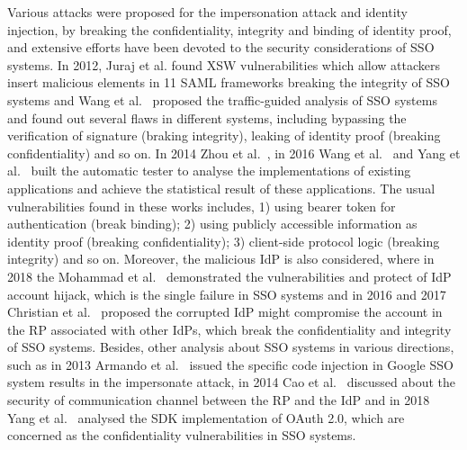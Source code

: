 Various attacks were proposed for the impersonation attack and identity injection, by breaking the confidentiality, integrity and binding of identity proof, and extensive efforts have been devoted to the security considerations of SSO systems. In 2012, Juraj et al.\cite{SomorovskyMSKJ12} found XSW vulnerabilities which allow attackers insert malicious elements in 11 SAML frameworks breaking the integrity of SSO systems and Wang et al.~\cite{WangCW12} proposed the traffic-guided analysis of SSO systems and found out several flaws in different systems, including bypassing the verification of signature (braking integrity), leaking of identity proof (breaking confidentiality) and so on. In 2014 Zhou et al.~\cite{ZhouE14}, in 2016 Wang et al.~\cite{WangZLG16} and Yang et al.~\cite{YangLLZH16} built the automatic tester to analyse the implementations of existing applications and achieve the statistical result of these applications. The usual vulnerabilities found in these works includes, 1) using bearer token for authentication (break binding); 2) using publicly accessible information as identity proof (breaking confidentiality); 3) client-side protocol logic (breaking integrity) and so on. Moreover, the malicious IdP is also considered, where in 2018 the Mohammad et al.~\cite{GhasemisharifRC18} demonstrated the vulnerabilities and protect of IdP account hijack, which is the single failure in SSO systems and in 2016 and 2017 Christian et al.~\cite{MainkaMS16, MainkaMSW17} proposed the corrupted IdP might compromise the account in the RP associated with other IdPs, which break the confidentiality and integrity of SSO systems. Besides, other analysis about SSO systems in various directions, such as in 2013 Armando et al.~\cite{ArmandoCCCPS13} issued the specific code injection in Google SSO system results in the impersonate attack, in 2014 Cao et al.~\cite{CaoSBKVC14} discussed about the security of communication channel between the RP and the IdP and in 2018 Yang et al.~\cite{YangLCZ18} analysed the SDK implementation of OAuth 2.0, which are concerned as the confidentiality vulnerabilities in SSO systems.




